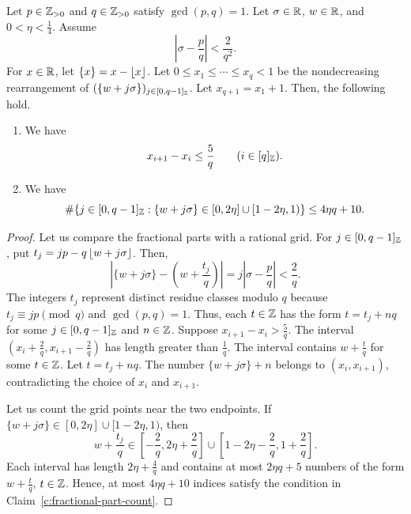 \begin{lemma}\label{lem:fractional-part-estimates}
Let $p\in\mathbb Z_{>0}$ and $q\in\mathbb Z_{>0}$ satisfy $\gcd(p,q)=1$.
Let $\sigma\in\mathbb R$, $w\in\mathbb R$, and $0<\eta<\frac14$. Assume
\[
 |\sigma-\frac pq|<\frac2{q^2}.
\]
For $x\in\mathbb R$, let $\{x\}=x-\left\lfloor x\right\rfloor$.
Let $0\le x_1\le\cdots\le x_q<1$ be the nondecreasing rearrangement of
$(\{w+j\sigma\})_{j\in[0,q-1]_{\mathbb Z}}$. Let $x_{q+1}=x_1+1$.
Then, the following hold.
\begin{enumerate}
\item\label{c:fractional-part-gaps} We have
\[
 x_{i+1}-x_i\le\frac5q\qquad(i\in[q]_{\mathbb Z}).
\]
\item\label{c:fractional-part-count} We have
\[
 \#\{j\in[0,q-1]_{\mathbb Z}:\{w+j\sigma\}\in[0,2\eta]\cup[1-2\eta,1)\}
 \le4\eta q+10.
\]
\end{enumerate}
\end{lemma}
\begin{proof}
 Let us compare the fractional parts with a rational grid.
For $j\in[0,q-1]_{\mathbb Z}$, put $t_j=jp-q\left\lfloor w+j\sigma\right\rfloor$.
Then,
\[
 \left|\{w+j\sigma\}-\left(w+\frac{t_j}{q}\right)\right|
 =j\left|\sigma-\frac pq\right|<\frac2q.
\]
The integers $t_j$ represent distinct residue classes modulo $q$ because
$t_j\equiv jp\pmod q$ and $\gcd(p,q)=1$.
Thus, each $t\in\mathbb Z$ has the form $t=t_j+nq$ for some
$j\in[0,q-1]_{\mathbb Z}$ and $n\in\mathbb Z$.
Suppose $x_{i+1}-x_i>\frac5q$.
The interval $(x_i+\frac2q,x_{i+1}-\frac2q)$ has length greater than $\frac1q$.
The interval contains $w+\frac tq$ for some $t\in\mathbb Z$.
Let $t=t_j+nq$.
The number $\{w+j\sigma\}+n$ belongs to $(x_i,x_{i+1})$,
contradicting the choice of $x_i$ and $x_{i+1}$.

 Let us count the grid points near the two endpoints.
If
$\{w+j\sigma\}\in[0,2\eta]\cup[1-2\eta,1)$, then
\[
 w+\frac{t_j}{q}\in
 \left[-\frac2q,2\eta+\frac2q\right]
 \cup\left[1-2\eta-\frac2q,1+\frac2q\right].
\]
Each interval has length $2\eta+\frac4q$ and contains at most $2\eta q+5$
numbers of the form $w+\frac tq$, $t\in\mathbb Z$.
Hence, at most $4\eta q+10$ indices satisfy the condition in Claim~\ref{c:fractional-part-count}.
\end{proof}

